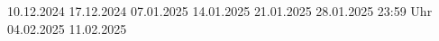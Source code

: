\renewcommand{\Klassetext}{10ac}



\dbprojekt %
{10.12.2024} %
{17.12.2024} %
{07.01.2025} %
{14.01.2025} %
{21.01.2025} %
{28.01.2025} %
{23:59 Uhr} %
{04.02.2025} %
{11.02.2025} %